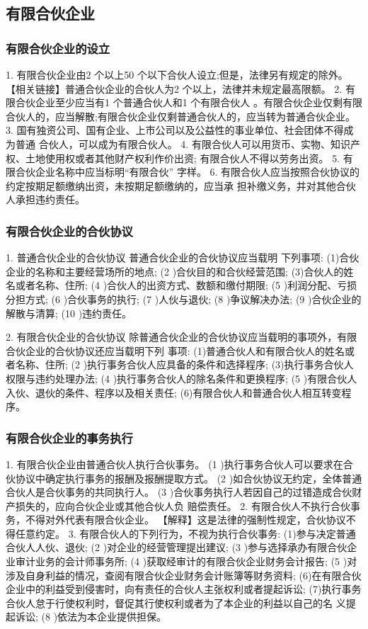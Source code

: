 \documentclass[UTF8,12pt]{ctexart}
\numberwithin{equation}{section} %
\numberwithin{figure}{section}
\numberwithin{table}{section}
\begin{document}
	
	\subsection{有限合伙企业}
	
	
	
	\subsubsection{有限合伙企业的设立}
	1. 有限合伙企业由2 个以上50 个以下合伙人设立;但是，法律另有规定的除外。
	【相关链接】普通合伙企业的合伙人为2 个以上，法律并未规定最高限额。
	2. 有限合伙企业至少应当有1 个普通合伙人和1 个有限合伙人 。有限合伙企业仅剩有限 合伙人的，应当解散;有限合伙企业仅剩普通合伙人的，应当转为普通合伙企业。
	3. 国有独资公司、国有企业、上市公司以及公益性的事业单位、社会团体不得成为普通 合伙人，可以成为有限合伙人。
	4. 有限合伙人可以用货币、实物、知识产权、土地使用权或者其他财产权利作价出资; 有限合伙人不得以劳务出资。
	5. 有限合伙企业名称中应当标明“有限合伙” 字样。
	6. 有限合伙人应当按照合伙协议的约定按期足额缴纳出资，未按期足额缴纳的，应当承 担补缴义务，并对其他合伙人承担违约责任。
	
	
	\subsubsection{有限合伙企业的合伙协议}
	1. 普通合伙企业的合伙协议
	普通合伙企业的合伙协议应当载明 下列事项: (1)合伙企业的名称和主要经营场所的地点;
	(2 )合伙目的和合伙经营范围;
	(3)合伙人的姓名或者名称、住所;
	(4 )合伙人的出资方式、数额和缴付期限;
	(5 )利润分配、亏损分担方式;
	(6 )合伙事务的执行;
	(7 )人伙与退伙;
	(8 )争议解决办法;
	(9 )合伙企业的解散与清算;
	(10 )违约责任。
	
	
	2. 有限合伙企业的合伙协议 除普通合伙企业的合伙协议应当载明的事项外，有限合伙企业的合伙协议还应当载明下列 事项:
	(1)普通合伙人和有限合伙人的姓名或者名称、住所;
	(2 )执行事务合伙人应具备的条件和选择程序; (3)执行事务合伙人权限与违约处理办法;
	(4 )执行事务合伙人的除名条件和更换程序;
	(5 )有限合伙人入伙、退伙的条件、程序以及相关责任; (6)有限合伙人和普通合伙人相互转变程序。
	
	\subsubsection{有限合伙企业的事务执行}
	1. 有限合伙企业由普通合伙人执行合伙事务。
	(1 )执行事务合伙人可以要求在合伙协议中确定执行事务的报酬及报酬提取方式。
	(2 )如合伙协议无约定，全体普通合伙人是合伙事务的共同执行人。
	(3 )合伙事务执行人若因自己的过错造成合伙财产损失的，应向合伙企业或其他合伙人负 赔偿责任。
	2. 有限合伙人不执行合伙事务，不得对外代表有限合伙企业。
	【解释】这是法律的强制性规定，合伙协议不得任意约定。
	3. 有限合伙人的下列行为，不视为执行合伙事务: (1)参与决定普通合伙人人伙、退伙;
	(2 )对企业的经营管理提出建议;
	(3 )参与选择承办有限合伙企业审计业务的会计师事务所;
	(4 )获取经审计的有限合伙企业财务会计报告;
	(5 )对涉及自身利益的情况，查阅有限合伙企业财务会计账簿等财务资料; (6)在有限合伙企业中的利益受到侵害时，向有责任的合伙人主张权利或者提起诉讼; (7)执行事务合伙人怠于行使权利时，督促其行使权利或者为了本企业的利益以自己的名 义提起诉讼;
	(8 )依法为本企业提供担保。
	
\end{document}
